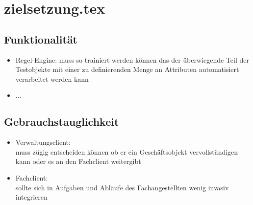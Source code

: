 \chapter{zielsetzung.tex}


\section{Funktionalität}

\begin{itemize}
\item Regel-Engine: muss so trainiert werden können das der überwiegende Teil der Testobjekte mit einer zu definierenden Menge an Attributen automatisiert verarbeitet werden kann
\item ...
\end{itemize}


\section{Gebrauchstauglichkeit}

\begin{itemize}
\item Verwaltungsclient:\\
muss zügig entscheiden können ob er ein Geschäftsobjekt vervollständigen kann oder es an den Fachclient weitergibt
\item Fachclient:\\
sollte sich in Aufgaben und Abläufe des Fachangestellten wenig invasiv integrieren
\end{itemize}


